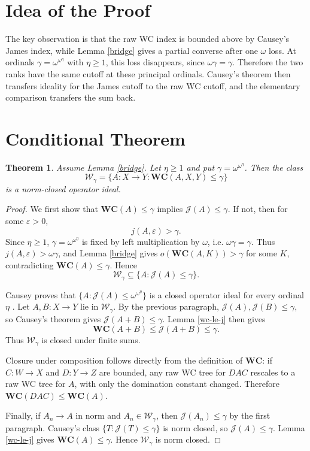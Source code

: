 \documentclass[11pt]{article}
\newtheorem{theorem}{Theorem}
\theoremstyle{definition}
\newcommand{\WC}{\mathbf{WC}}
\newcommand{\J}{\mathcal{J}}
\begin{document}
\section{Idea of the Proof}

The key observation is that the raw WC index is bounded above by Causey's
James index, while Lemma \ref{bridge} gives a partial converse after one
$\omega$ loss.  At ordinals $\gamma=\omega^{\omega^\eta}$ with $\eta\geq 1$,
this loss disappears, since $\omega\gamma=\gamma$.  Therefore the two ranks
have the same cutoff at these principal ordinals.  Causey's theorem then
transfers ideality for the James cutoff to the raw WC cutoff, and the
elementary comparison transfers the sum back.

\section{Conditional Theorem}

\begin{theorem}\label{main}
Assume Lemma \ref{bridge}.  Let $\eta\geq 1$ and put
$\gamma=\omega^{\omega^\eta}$.  Then the class
\[
  \mathcal{W}_\gamma
  =\{A:X\to Y:\WC(A,X,Y)\leq \gamma\}
\]
is a norm-closed operator ideal.
\end{theorem}

\begin{proof}
We first show that $\WC(A)\leq\gamma$ implies $\J(A)\leq\gamma$.  If not, then
for some $\varepsilon>0$,
\[
  j(A,\varepsilon)>\gamma.
\]
Since $\eta\geq 1$, $\gamma=\omega^{\omega^\eta}$ is fixed by left
multiplication by $\omega$, i.e. $\omega\gamma=\gamma$.  Thus
$j(A,\varepsilon)>\omega\gamma$, and Lemma \ref{bridge} gives
$o(\WC(A,K))>\gamma$ for some $K$, contradicting $\WC(A)\leq\gamma$.
Hence
\[
  \mathcal{W}_\gamma\subseteq \{A:\J(A)\leq\gamma\}.
\]

Causey proves that $\{A:\J(A)\leq\omega^{\omega^\eta}\}$ is a closed operator
ideal for every ordinal $\eta$ \cite{CauseyJ}.  Let $A,B:X\to Y$ lie in
$\mathcal{W}_\gamma$.  By the previous paragraph,
$\J(A),\J(B)\leq\gamma$, so Causey's theorem gives $\J(A+B)\leq\gamma$.
Lemma \ref{wc-le-j} then gives
\[
  \WC(A+B)\leq \J(A+B)\leq\gamma.
\]
Thus $\mathcal{W}_\gamma$ is closed under finite sums.

Closure under composition follows directly from the definition of $\WC$: if
$C:W\to X$ and $D:Y\to Z$ are bounded, any raw WC tree for $DAC$ rescales to a
raw WC tree for $A$, with only the domination constant changed.  Therefore
$\WC(DAC)\leq\WC(A)$.

Finally, if $A_n\to A$ in norm and $A_n\in\mathcal{W}_\gamma$, then
$\J(A_n)\leq\gamma$ by the first paragraph.  Causey's class
$\{T:\J(T)\leq\gamma\}$ is norm closed, so $\J(A)\leq\gamma$.  Lemma
\ref{wc-le-j} gives $\WC(A)\leq\gamma$.  Hence $\mathcal{W}_\gamma$ is norm
closed.
\end{proof}
\end{document}
